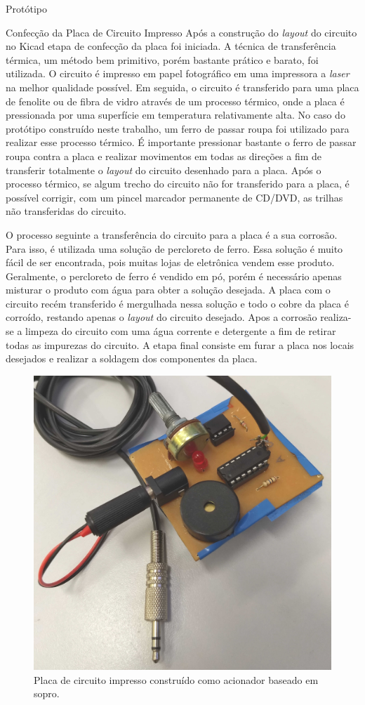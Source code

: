 \begin{chapter}{Protótipo}
\begin{section}{Confecção da Placa de Circuito Impresso}
Após a construção do \textit{layout} do circuito no Kicad etapa de confecção da
placa foi iniciada. A técnica de transferência térmica, um método bem primitivo,
porém bastante prático e barato, foi utilizada. O circuito é impresso em papel
fotográfico em uma impressora a \textit{laser} na melhor qualidade possível. Em
seguida, o circuito é transferido para uma placa de fenolite ou de fibra de
vidro através de um processo térmico, onde a placa é pressionada por uma
superfície em temperatura relativamente alta. No caso do protótipo construído
neste trabalho, um ferro de passar roupa foi utilizado para realizar esse
processo térmico. É importante pressionar bastante o ferro de passar roupa
contra a placa e realizar movimentos em todas as direções a fim de transferir
totalmente o \textit{layout} do circuito desenhado para a placa. Após o processo
térmico, se algum trecho do circuito não for transferido para a placa, é
possível corrigir, com um pincel marcador permanente de CD/DVD, as trilhas não
transferidas do circuito. 

O processo seguinte a transferência do circuito para a placa é a sua corrosão.
Para isso, é utilizada uma solução de percloreto de ferro. Essa solução é
muito fácil de ser encontrada, pois muitas lojas de eletrônica vendem esse
produto. Geralmente, o percloreto de ferro é vendido em pó, porém é necessário
apenas misturar o produto com água para obter a solução desejada. A placa com o
circuito recém transferido é mergulhada nessa solução e todo o cobre da placa é
corroído, restando apenas o \textit{layout} do circuito desejado. Apos a
corrosão realiza-se a limpeza do circuito com uma água corrente e detergente a
fim de retirar todas as impurezas do circuito. A etapa final consiste em furar a
placa nos locais desejados e realizar a soldagem dos componentes da placa.

\begin{figure}[!h]
	\centering
	\begin{minipage}[c]{\textwidth}
	\centering
	\includegraphics[width=0.45\linewidth]{fig/puff2}
	\caption{Placa de circuito impresso construído como acionador baseado em sopro.}
	\label{fig:placa}
	\end{minipage}
\end{figure} 


\end{section}
\end{chapter}
